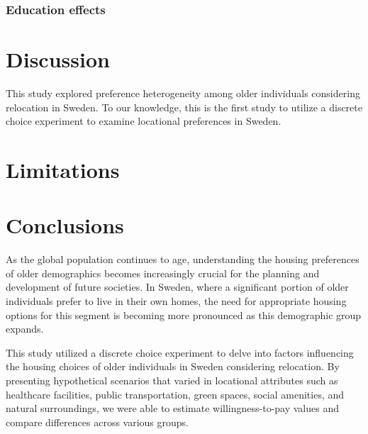 \documentclass[3p,11pt ]{elsarticle}
\begin{document}
\clearpage


\subsubsection{Education effects}




\section{Discussion}

This study explored preference heterogeneity among older individuals considering relocation in Sweden.
To our knowledge, 
this is the first study to utilize a discrete choice experiment to examine locational preferences in Sweden.

\section{Limitations}



\section{Conclusions}

As the global population continues to age, understanding the housing preferences of older demographics becomes increasingly crucial for the planning and development of future societies.
In Sweden, where a significant portion of older individuals prefer to live in their own homes, the need for appropriate housing options for this segment is becoming more pronounced as this demographic group expands. 

This study utilized a discrete choice experiment to delve into factors influencing the housing choices of older individuals in Sweden considering relocation.
By presenting hypothetical scenarios that varied in locational attributes such as healthcare facilities, public transportation, green spaces, social amenities, and natural surroundings, we were able to estimate willingness-to-pay values and compare differences across various groups.

%
\end{document}
